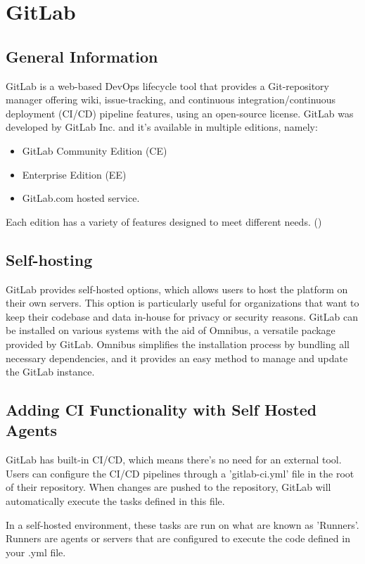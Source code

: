 \chapter{GitLab}

\section{General Information}
GitLab is a web-based DevOps lifecycle tool that provides a Git-repository manager offering wiki, issue-tracking, and continuous integration/continuous deployment (CI/CD) pipeline features, using an open-source license.
GitLab was developed by GitLab Inc. and it's available in multiple editions, namely:
\begin{itemize}
    \item GitLab Community Edition (CE)
    \item Enterprise Edition (EE)
    \item GitLab.com hosted service.
\end{itemize}
Each edition has a variety of features designed to meet different needs. (\cite{refAboutGitLab})

\section{Self-hosting}
GitLab provides self-hosted options, which allows users to host the platform on their own servers.
This option is particularly useful for organizations that want to keep their codebase and data in-house for privacy or security reasons.
GitLab can be installed on various systems with the aid of Omnibus, a versatile package provided by GitLab.
Omnibus simplifies the installation process by bundling all necessary dependencies, and it provides an easy method to manage and update the GitLab instance.

\section{Adding CI Functionality with Self Hosted Agents}
GitLab has built-in CI/CD, which means there's no need for an external tool.
Users can configure the CI/CD pipelines through a 'gitlab-ci.yml' file in the root of their repository.
When changes are pushed to the repository, GitLab will automatically execute the tasks defined in this file.

In a self-hosted environment, these tasks are run on what are known as 'Runners'.
Runners are agents or servers that are configured to execute the code defined in your .yml file.

